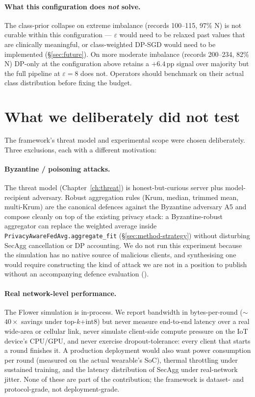 \documentclass[11pt,a4paper]{report}
\begin{document}
\paragraph{What this configuration does \emph{not} solve.} The class-prior
collapse on extreme imbalance (records 100--115, 97\% N) is not curable
within this configuration --- $\varepsilon$ would need to be relaxed past values
that are clinically meaningful, or class-weighted DP-SGD would need to be
implemented (\S\ref{sec:future}). On more moderate imbalance (records
200--234, 82\% N) DP-only at the configuration above retains a
$+6.4$\,pp signal over majority but the full pipeline at $\varepsilon =
8$ does not. Operators should benchmark on their actual class
distribution before fixing the budget.

\section{What we deliberately did not test}

The framework's threat model and experimental scope were chosen
deliberately. Three exclusions, each with a different motivation:

\paragraph{Byzantine / poisoning attacks.}
The threat model (Chapter~\ref{ch:threat}) is honest-but-curious server
plus model-recipient adversary. Robust aggregation rules (Krum, median,
trimmed mean, multi-Krum) are the canonical defences against the
Byzantine adversary A5 and compose cleanly on top of the existing
privacy stack: a Byzantine-robust aggregator can replace the weighted
average inside \texttt{PrivacyAwareFedAvg.aggregate\_fit}
(\S\ref{sec:method-strategy}) without disturbing SecAgg cancellation or
DP accounting. We do not run this experiment because the simulation has
no native source of malicious clients, and synthesising one would
require constructing the kind of attack we are not in a position to
publish without an accompanying defence evaluation
(\cite{blanchard2017krum, yin2018byzantine}).

\paragraph{Real network-level performance.}
The Flower simulation is in-process. We report bandwidth in bytes-per-round
($\sim$$40\times$ savings under top-$k$+int8) but never measure
end-to-end latency over a real wide-area or cellular link, never simulate
client-side compute pressure on the IoT device's CPU/GPU, and never
exercise dropout-tolerance: every client that starts a round finishes
it. A production deployment would also want power consumption per round
(measured on the actual wearable's SoC), thermal throttling under
sustained training, and the latency distribution of SecAgg under
real-network jitter. None of these are part of the contribution; the
framework is dataset- and protocol-grade, not deployment-grade.
\end{document}
